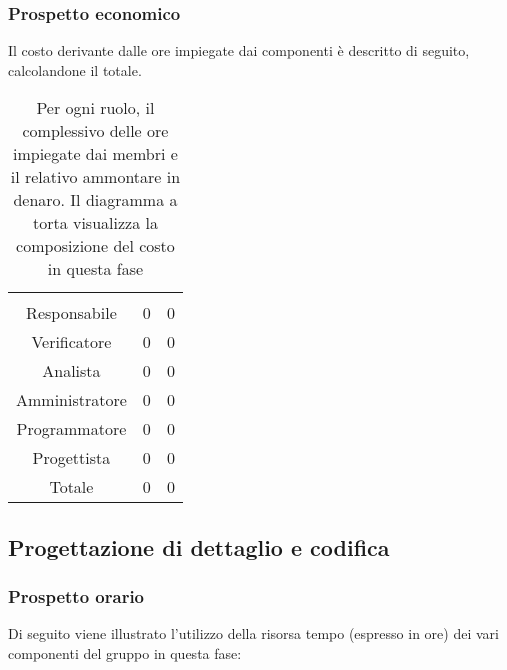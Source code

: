 \subsubsection{Prospetto economico}
Il costo derivante dalle ore impiegate dai componenti è descritto di seguito, calcolandone il totale.

\begin{table}[hbt!]
{\setlength{\parindent}{0cm}
\begin{minipage}{.43\textwidth}
	\begin{tabular}{ccc}
	\rowcolorhead
	\headertitle{Ruolo} & \headertitle{Ore} & \headertitle{Costo(€)}\\
	Responsabile & 0 & 0\\
	Verificatore & 0 & 0\\
	Analista & 0 & 0\\
	Amministratore & 0 & 0\\
	Programmatore & 0 & 0\\
	Progettista & 0 & 0\\
	\hline
	Totale & 0& 0\\
	\end{tabular}
\end{minipage}%
\begin{minipage}{.57\textwidth}
\end{minipage} }
\caption{Per ogni ruolo, il complessivo delle ore impiegate dai membri e il relativo ammontare in denaro. Il diagramma a torta visualizza la composizione del costo in questa fase}
\end{table}

\subsection{Progettazione di dettaglio e codifica}
\subsubsection{Prospetto orario}
Di seguito viene illustrato l'utilizzo della risorsa tempo (espresso in ore) dei vari componenti del gruppo in questa fase:

